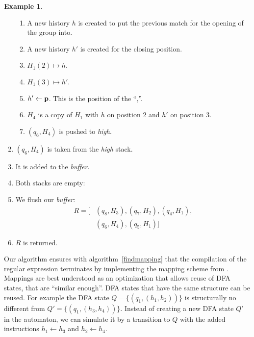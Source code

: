 \documentclass[english]{sigplanconf}
\theoremstyle{definition}
\newtheorem{example}{Example}[section]
\begin{document}
\begin{example}
\begin{enumerate}
\begin{enumerate}
	\item A new history $h$ is created to put the previous match for the opening of the group into.
	\item A new history $h'$ is created for the closing position.
	\item $H_1(2) \mapsto h$. 
	\item $H_1(3) \mapsto h'$.
	\item $h'\leftarrow\mathbf{\mathbf{p}}$. This is the position of the ``,''.
	\item $H_4$ is a copy of $H_1$ with $h$ on position 2 and $h'$ on position 3.
	\item $(q_6, H_4)$ is pushed to \emph{high}.
\end{enumerate}
\item $(q_6, H_4)$ is taken from the \emph{high} stack.
\item It is added to the \emph{buffer}.
\item Both stacks are empty:
\item We flush our \emph{buffer}: 
\begin{align*}
R=[&(q_8, H_3), (q_7, H_2), (q_4, H_1),\\ &(q_6, H_4), (q_5, H_1)]
\end{align*}
\item $R$ is returned.
\end{enumerate}
\end{example}

Our algorithm ensures with algorithm~\ref{findmapping} that the 
compilation of the regular expression terminates by implementing 
the mapping scheme from \cite{Laur00a}. 
Mappings are best understood as an optimization that allows reuse
of DFA states, that are ``similar enough''. DFA states that have the 
same structure can be reused. For example the DFA state 
$Q=\{(q_1, (h_1, h_2))\}$ is structurally no different from 
$Q'=\{(q_1, (h_3, h_4))\}$. Instead of creating a new DFA state $Q'$ 
in the automaton, we can simulate it by a transition to $Q$ with the
added instructions $h_1\leftarrow h_3$ and $h_2 \leftarrow h_4$.
\end{document}
